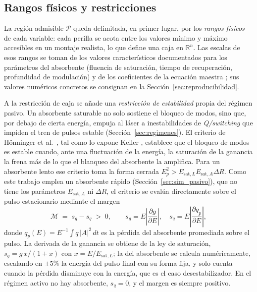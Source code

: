 \subsection{Rangos físicos y restricciones}
\label{sec:restricciones}

La región admisible $\mathcal{P}$ queda delimitada, en primer lugar, por los
\emph{rangos físicos} de cada variable: cada perilla se acota entre los valores
mínimo y máximo accesibles en un montaje realista, lo que define una caja en
$\mathbb{R}^n$. Las escalas de esos rangos se toman de los valores característicos
documentados para los parámetros del absorbente (fluencia de saturación, tiempo de
recuperación, profundidad de modulación) y de los coeficientes de la ecuación
maestra \cite{Keller2022}; sus valores numéricos concretos se consignan en la
Sección~\ref{sec:reproducibilidad}.

A la restricción de caja se añade una \emph{restricción de estabilidad} propia del
régimen pasivo. Un absorbente saturable no solo sostiene el bloqueo de modos, sino
que, por debajo de cierta energía, empuja al láser a inestabilidades de
\emph{Q\-/switching} que impiden el tren de pulsos estable
(Sección~\ref{sec:regimenes}). %
El criterio de Hönninger et al.\ \cite{Honninger1999}, tal como lo expone Keller
\cite{Keller2022}, establece que el bloqueo de modos es estable cuando, ante una
fluctuación de la energía, la saturación de la ganancia la frena más de lo que el
blanqueo del absorbente la amplifica. Para un absorbente lento ese criterio toma la
forma cerrada $E_p^{2}>E_{\mathrm{sat},L}E_{\mathrm{sat},A}\Delta R$. Como este trabajo
emplea un absorbente rápido (Sección~\ref{sec:sim_pasivo}), que no tiene los parámetros
$E_{\mathrm{sat},A}$ ni $\Delta R$, el criterio se evalúa directamente sobre el pulso
estacionario mediante el margen
%
\begin{equation}
    \mathcal{M} \;=\; s_g - s_q \;>\; 0,
    \qquad
    s_g = E\left|\frac{\partial g}{\partial E}\right|,
    \quad
    s_q = E\left|\frac{\partial q_p}{\partial E}\right|,
    \label{eq:restriccion_qml}
\end{equation}
%
donde $q_p(E)=E^{-1}\int q\,|A|^2\,dt$ es la pérdida del absorbente promediada sobre el
pulso. La derivada de la ganancia se obtiene de la ley de saturación,
$s_g=g\,x/(1+x)$ con $x=E/E_{\mathrm{sat},L}$; la del absorbente se calcula
numéricamente, escalando en $\pm5\%$ la energía del pulso final con su forma fija, y
solo cuenta cuando la pérdida disminuye con la energía, que es el caso
desestabilizador. En el régimen activo no hay absorbente, $s_q=0$, y el margen es
siempre positivo.


